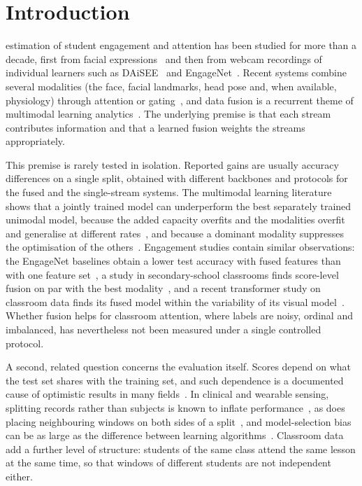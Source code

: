 \section{Introduction}
\label{sec:intro}

 estimation of student engagement and attention has been studied for more than a decade, first from facial expressions~\cite{whitehill2014faces} and then from webcam recordings of individual learners such as DAiSEE~\cite{gupta2016daisee} and EngageNet~\cite{singh2023engagenet}. Recent systems combine several modalities (the face, facial landmarks, head pose and, when available, physiology) through attention or gating~\cite{baltrusaitis2019multimodal,arevalo2017gated,tran2026ordinal}, and data fusion is a recurrent theme of multimodal learning analytics~\cite{chango2022datafusionmmla}. The underlying premise is that each stream contributes information and that a learned fusion weights the streams appropriately.

This premise is rarely tested in isolation. Reported gains are usually accuracy differences on a single split, obtained with different backbones and protocols for the fused and the single-stream systems. The multimodal learning literature shows that a jointly trained model can underperform the best separately trained unimodal model, because the added capacity overfits and the modalities overfit and generalise at different rates~\cite{wang2020makes}, and because a dominant modality suppresses the optimisation of the others~\cite{peng2022balanced}. Engagement studies contain similar observations: the EngageNet baselines obtain a lower test accuracy with fused features than with one feature set~\cite{singh2023engagenet}, a study in secondary-school classrooms finds score-level fusion on par with the best modality~\cite{sumer2023multimodal}, and a recent transformer study on classroom data finds its fused model within the variability of its visual model~\cite{fragkiadakis2026fairness}. Whether fusion helps for classroom attention, where labels are noisy, ordinal and imbalanced, has nevertheless not been measured under a single controlled protocol.

A second, related question concerns the evaluation itself. Scores depend on what the test set shares with the training set, and such dependence is a documented cause of optimistic results in many fields~\cite{kapoor2023leakage}. In clinical and wearable sensing, splitting records rather than subjects is known to inflate performance~\cite{saeb2017need}, as does placing neighbouring windows on both sides of a split~\cite{hammerla2015lets}, and model-selection bias can be as large as the difference between learning algorithms~\cite{cawley2010overfitting}. Classroom data add a further level of structure: students of the same class attend the same lesson at the same time, so that windows of different students are not independent either.

